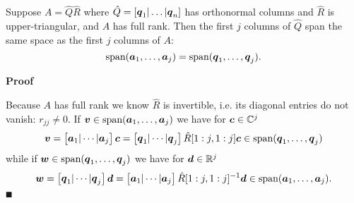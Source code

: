 \begin{proposition} Suppose $A = \hat Q  \hat R$ where $\hat Q = [\bm{{\mbox{\boldmath$q$\unboldmath}}}_1|\ldots|\bm{{\mbox{\boldmath$q$\unboldmath}}}_n]$ has orthonormal columns and $\hat R$ is upper-triangular, and $A$ has full rank. Then the first $j$ columns of $\hat Q$ span the same space as the first $j$ columns of $A$:
\[
\hbox{span}(\bm{{\mbox{\boldmath$a$\unboldmath}}}_1,\ldots,\bm{{\mbox{\boldmath$a$\unboldmath}}}_j) = \hbox{span}(\bm{{\mbox{\boldmath$q$\unboldmath}}}_1,\ldots,\bm{{\mbox{\boldmath$q$\unboldmath}}}_j).
\]
\end{proposition}
\textbf{Proof}

Because $A$ has full rank we know $\hat R$ is invertible, i.e. its diagonal entries do not vanish: $r_{jj} \ensuremath{\neq} 0$. If $\bm{{\mbox{\boldmath$v$\unboldmath}}} \in \hbox{span}(\bm{{\mbox{\boldmath$a$\unboldmath}}}_1,\ldots,\bm{{\mbox{\boldmath$a$\unboldmath}}}_j)$ we have for $\bm{{\mbox{\boldmath$c$\unboldmath}}} \in {\mathbb C}^j$
\[
\bm{{\mbox{\boldmath$v$\unboldmath}}} = \begin{bmatrix} \bm{{\mbox{\boldmath$a$\unboldmath}}}_1 | \cdots | \bm{{\mbox{\boldmath$a$\unboldmath}}}_j \end{bmatrix} \bm{{\mbox{\boldmath$c$\unboldmath}}} = 
\begin{bmatrix} \bm{{\mbox{\boldmath$q$\unboldmath}}}_1 | \cdots | \bm{{\mbox{\boldmath$q$\unboldmath}}}_j \end{bmatrix}  \hat R[1:j,1:j] \bm{{\mbox{\boldmath$c$\unboldmath}}} \in \hbox{span}(\bm{{\mbox{\boldmath$q$\unboldmath}}}_1,\ldots,\bm{{\mbox{\boldmath$q$\unboldmath}}}_j)
\]
while if $\bm{{\mbox{\boldmath$w$\unboldmath}}} \in \hbox{span}(\bm{{\mbox{\boldmath$q$\unboldmath}}}_1,\ldots,\bm{{\mbox{\boldmath$q$\unboldmath}}}_j)$ we have for $\mbox{\boldmath$d$\unboldmath} \in {\mathbb R}^j$
\[
\bm{{\mbox{\boldmath$w$\unboldmath}}} = \begin{bmatrix} \bm{{\mbox{\boldmath$q$\unboldmath}}}_1 | \cdots | \bm{{\mbox{\boldmath$q$\unboldmath}}}_j \end{bmatrix} \mbox{\boldmath$d$\unboldmath}  =  \begin{bmatrix} \bm{{\mbox{\boldmath$a$\unboldmath}}}_1 | \cdots | \bm{{\mbox{\boldmath$a$\unboldmath}}}_j \end{bmatrix} \hat R[1:j,1:j]^{-1} \mbox{\boldmath$d$\unboldmath} \in  \hbox{span}(\bm{{\mbox{\boldmath$a$\unboldmath}}}_1,\ldots,\bm{{\mbox{\boldmath$a$\unboldmath}}}_j).
\]
\ensuremath{\QED}


